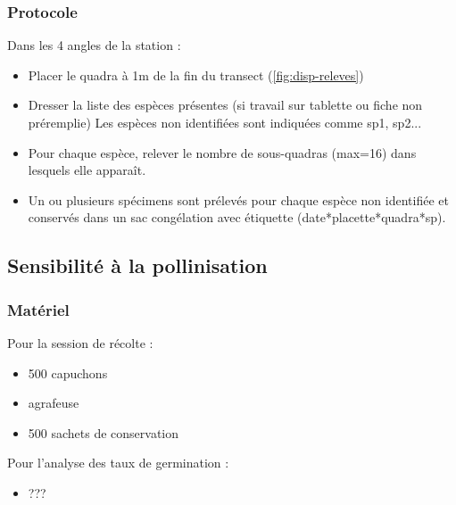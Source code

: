 \documentclass{article}
\begin{document}
	\subsubsection{Protocole}
	Dans les 4 angles de la station :
	\begin{itemize}
		\item Placer le quadra à 1m de la fin du transect (\autoref{fig:disp-releves})
		\item Dresser la liste des espèces présentes (si travail sur tablette ou fiche non préremplie) Les espèces non identifiées sont indiquées comme sp1, sp2...
		\item Pour chaque espèce, relever le nombre de sous-quadras (max=16) dans lesquels elle apparaît.
		\item Un ou plusieurs spécimens sont prélevés pour chaque espèce non identifiée et conservés dans un sac congélation avec étiquette (date*placette*quadra*sp).
	\end{itemize}
	
	\subsection{Sensibilité à la pollinisation}
	\subsubsection{Matériel}
	Pour la session de récolte :
	\begin{itemize}
		\item 500 capuchons
		\item agrafeuse
		\item 500 sachets de conservation
	\end{itemize}
	Pour l'analyse des taux de germination :
	\begin{itemize}
		\item ???
	\end{itemize}
\end{document}
